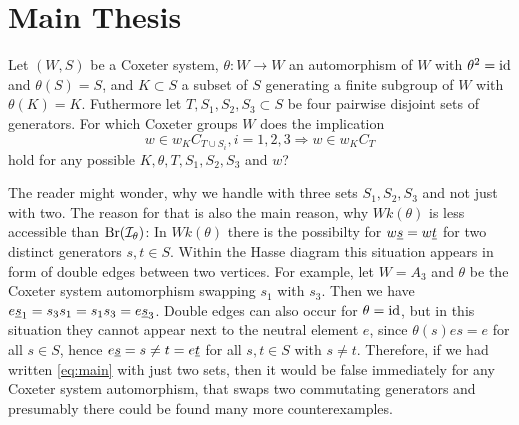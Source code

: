 \section{Main Thesis}
\label{sec:main-thesis}

\begin{ques}
	Let $(W,S)$ be a Coxeter system, $\theta : W \to W$ an automorphism of $W$ with $\theta^2 = \operatorname{id}$ and $\theta(S) = S$, and $K \subset S$ a subset of $S$ generating a finite subgroup of $W$ with $\theta(K) = K$. Futhermore let $T,S_1,S_2,S_3 \subset S$ be four pairwise disjoint sets of generators. For which Coxeter groups $W$ does the implication
	\begin{equation}
		\label{eq:main}
		w \in w_K C_{T \cup S_i}, i=1,2,3 \Rightarrow w \in w_K C_T
	\end{equation}
	hold for any possible $K,\theta,T,S_1,S_2,S_3$ and $w$?
\end{ques}

The reader might wonder, why we handle with three sets $S_1,S_2,S_3$ and not just with two. The reason for that is also the main reason, why $Wk(\theta)$ is less accessible than $\operatorname{Br}(\mathcal{I}_{\theta})$: In $Wk(\theta)$ there is the possibilty for $w \underline{s} = w \underline{t}$ for two distinct generators $s,t \in S$. Within the Hasse diagram this situation appears in form of double edges between two vertices. For example, let $W = A_3$ and $\theta$ be the Coxeter system automorphism swapping $s_1$ with $s_3$. Then we have $e \underline{s}_1 = s_3 s_1 = s_1 s_3 = e \underline{s}_3$. Double edges can also occur for $\theta = \operatorname{id}$, but in this situation they cannot appear next to the neutral element $e$, since $\theta(s)es = e$ for all $s \in S$, hence $e \underline{s} = s \neq t = e \underline{t}$ for all $s,t \in S$ with $s \neq t$. Therefore, if we had written \ref{eq:main} with just two sets, then it would be false immediately for any Coxeter system automorphism, that swaps two commutating generators and presumably there could be found many more counterexamples.

